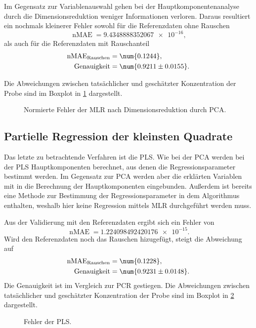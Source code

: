 Im Gegensatz zur Variablenauswahl gehen bei der Hauptkomponentenanalyse durch die Dimensionsreduktion weniger Informationen verloren.
Daraus resultiert ein nochmals kleinerer Fehler sowohl für die Referenzdaten ohne Rauschen
\begin{equation*}
  \operatorname{nMAE} = \num{9.4348888352067e-16},
\end{equation*}
als auch für die Referenzdaten mit Rauschanteil
\begin{align*}
  \operatorname{nMAE}_\mathrm{Rauschen} &= \num{0.1244}, \\
  \operatorname{Genauigkeit} &= \num{0.9211 \pm 0.0155}.
\end{align*}

Die Abweichungen zwischen tatsächlicher und geschätzter Konzentration der Probe sind im Boxplot in \cref{fig:PCRerror} dargestellt.
\begin{figure} [htb]
  \centering
  
  \caption{Normierte Fehler der MLR nach Dimensionsreduktion durch PCA.}
  \label{fig:PCRerror}
\end{figure}

\subsection{Partielle Regression der kleinsten Quadrate}
Das letzte zu betrachtende Verfahren ist die \gls{PLS}.
Wie bei der \gls{PCA} werden bei der \gls{PLS} Hauptkomponenten berechnet, aus denen die Regressionsparameter bestimmt werden.
Im Gegensatz zur \gls{PCA} werden aber die erklärten Variablen mit in die Berechnung der Hauptkomponenten eingebunden.
Außerdem ist bereits eine Methode zur Bestimmung der Regressionsparameter in dem Algorithmus enthalten, weshalb hier keine Regression mittels \gls{MLR} durchgeführt werden muss.

Aus der Validierung mit den Referenzdaten ergibt sich ein Fehler von
\begin{equation*}
  \operatorname{nMAE} = \num{1.224098492420176e-15}.
\end{equation*}
Wird den Referenzdaten noch das Rauschen hizugefügt, steigt die Abweichung auf
\begin{align*}
  \operatorname{nMAE}_\mathrm{Rauschen} &= \num{0.1228}, \\
  \operatorname{Genauigkeit} &= \num{0.9231 \pm 0.0148}.
\end{align*}
Die Genauigkeit ist im Vergleich zur \gls{PCR} gestiegen.
Die Abweichungen zwischen tatsächlicher und geschätzter Konzentration der Probe sind im Boxplot in \cref{fig:PLSerror} dargestellt.
\begin{figure} [htb]
  \centering
  
  \caption{Fehler der PLS.}
  \label{fig:PLSerror}
\end{figure}

